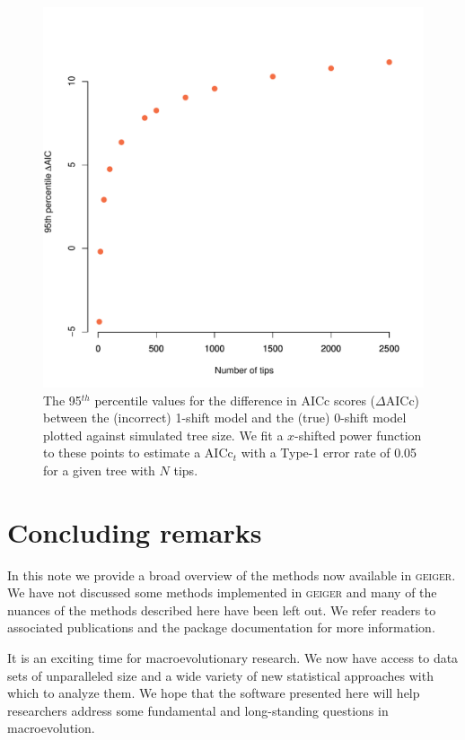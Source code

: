 \begin{figure}[p]
 \centering
  \includegraphics[width=\textwidth]{figs/BD_percentiles}
  \caption[Setting the \textsc{medusa} threshold via simulation]{The 95$^{th}$ percentile values for the difference in AICc scores ($\Delta$AICc) between the (incorrect) 1-shift model and the (true) 0-shift model plotted against simulated tree size. We fit a $x$-shifted power function to these points to estimate a AICc$_{t}$ with a Type-1 error rate of 0.05 for a given tree with $N$ tips.}
  \label{fig:medusa-threshold}
\end{figure}


\section{Concluding remarks}

In this note we provide a broad overview of the methods now available in \textsc{geiger}. We have not discussed some methods implemented in \textsc{geiger} \citep[e.g., `Congruification' for time-scaling large trees;][]{Eastman2013} and many of the nuances of the methods described here have been left out. We refer readers to associated publications and the package documentation for more information.

It is an exciting time for macroevolutionary research. We now have access to data sets of unparalleled size and a wide variety of new statistical approaches with which to analyze them. We hope that the software presented here will help researchers address some fundamental and long-standing questions in macroevolution. 
